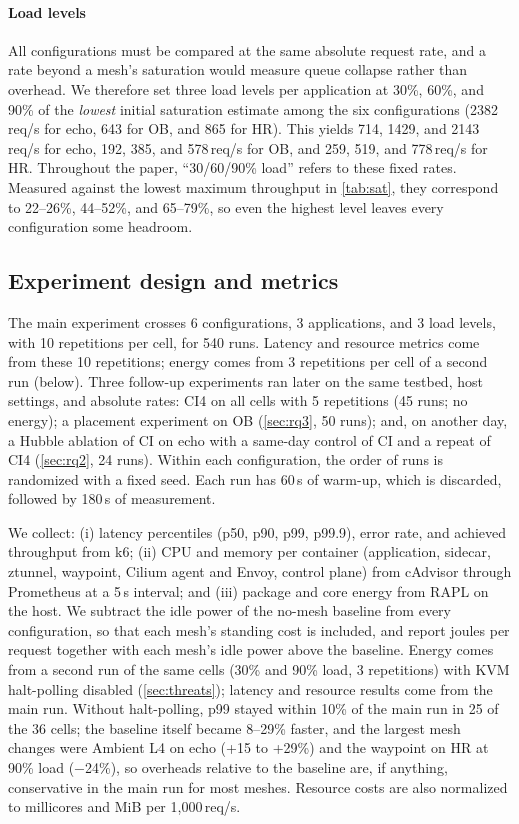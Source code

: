 \paragraph{Load levels}
All configurations must be compared at the same absolute request rate, and a
rate beyond a mesh's saturation would measure queue collapse rather than
overhead. We therefore set three load levels per application at 30\%, 60\%,
and 90\% of the \emph{lowest} initial saturation estimate among the six
configurations (2382\,req/s for echo, 643 for OB, and 865 for HR). This yields
714, 1429, and 2143\,req/s for echo, 192, 385, and 578\,req/s for OB, and 259,
519, and 778\,req/s for HR. Throughout the paper, ``30/60/90\% load'' refers to
these fixed rates. Measured against the lowest maximum throughput in
\cref{tab:sat}, they correspond to 22--26\%, 44--52\%, and 65--79\%, so even
the highest level leaves every configuration some headroom.

\subsection{Experiment design and metrics}
\label{sec:design}

The main experiment crosses 6 configurations, 3 applications, and 3 load
levels, with 10 repetitions per cell, for 540 runs. Latency and resource
metrics come from these 10 repetitions; energy comes from 3 repetitions per
cell of a second run (below). Three follow-up experiments ran later on the same
testbed, host settings, and absolute rates: CI4 on all cells with 5
repetitions (45 runs; no energy); a placement experiment on OB (\cref{sec:rq3},
50 runs); and, on another day, a Hubble ablation of CI on echo with a
same-day control of CI and a repeat of CI4 (\cref{sec:rq2}, 24 runs). Within each configuration,
the order of runs is randomized with a fixed seed. Each run has 60\,s of
warm-up, which is discarded, followed by 180\,s of measurement.

We collect: (i) latency percentiles (p50, p90, p99, p99.9), error rate, and
achieved throughput from k6; (ii) CPU and memory per container (application,
sidecar, ztunnel, waypoint, Cilium agent and Envoy, control plane) from
cAdvisor through Prometheus at a 5\,s interval; and (iii) package and core
energy from RAPL on the host. We subtract the idle power of the no-mesh
baseline from every configuration, so that each mesh's standing cost is
included, and report joules per request together with each mesh's idle power
above the baseline. Energy comes from a second run of the same cells (30\%
and 90\% load, 3 repetitions) with KVM halt-polling disabled
(\cref{sec:threats}); latency and resource results come from the main run.
Without halt-polling, p99 stayed within 10\% of the main run in 25 of the 36
cells; the baseline itself became 8--29\% faster, and the largest mesh changes
were Ambient L4 on echo (+15 to +29\%) and the waypoint on HR at 90\% load
($-$24\%), so overheads relative to the baseline are, if anything, conservative
in the main run for most meshes. Resource
costs are also
normalized to millicores and MiB per 1{,}000\,req/s.

